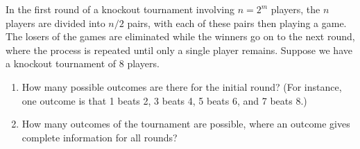 \begin{examplebox}
    In the first round of a knockout tournament involving $n = 2^m$ players, the $n$ players are divided into $n/2$ pairs, with each of these pairs then playing a game. The losers of the games are eliminated while the winners go on to the next round, where the process is repeated until only a single player remains. Suppose we have a knockout tournament of 8 players.

\begin{enumerate}[label=(\alph*)]
    \item How many possible outcomes are there for the initial round? (For instance, one outcome is that 1 beats 2, 3 beats 4, 5 beats 6, and 7 beats 8.)
    \item How many outcomes of the tournament are possible, where an outcome gives complete information for all rounds?
\end{enumerate}


\end{examplebox}


